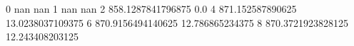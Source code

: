 0 nan nan
1 nan nan
2 858.1287841796875 0.0
4 871.152587890625 13.0238037109375
6 870.9156494140625 12.786865234375
8 870.3721923828125 12.243408203125
